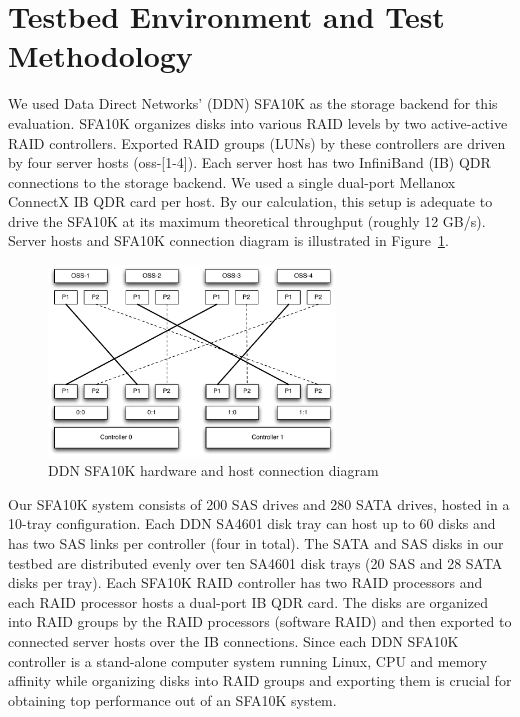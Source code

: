 \section{Testbed Environment and Test Methodology}
\label{sec:testbed}

We used Data Direct Networks' (DDN) SFA10K as the storage backend for this
evaluation. SFA10K organizes disks into various RAID levels by two
active-active RAID controllers. Exported RAID groups (LUNs) by these
controllers are driven by four server hosts (oss-[1-4]).  Each server host has
two InfiniBand (IB) QDR connections to the storage backend.  We used a single
dual-port Mellanox ConnectX IB QDR card per host.  By our calculation, this
setup is adequate to drive the SFA10K at its maximum theoretical throughput
(roughly 12 GB/s). Server hosts and SFA10K connection diagram is illustrated in
Figure~\ref{fig:ddn-sfa10k}.

\begin{figure}[htb]
\centering
\includegraphics[width=3in]{figs/sfa10k}
\caption{DDN SFA10K hardware and host connection diagram}
\label{fig:ddn-sfa10k}
\end{figure}


Our SFA10K system consists of 200 SAS drives and 280 SATA drives, hosted in a
10-tray configuration. Each DDN SA4601 disk tray can host up to 60 disks and
has two SAS links per controller (four in total). The SATA and SAS disks in our
testbed are distributed evenly over ten SA4601 disk trays (20 SAS and 28 SATA
disks per tray). Each SFA10K RAID controller has two RAID processors and each
RAID processor hosts a dual-port IB QDR card. The disks are organized into RAID
groups by the RAID processors (software RAID) and then exported to connected
server hosts over the IB connections. Since each DDN SFA10K controller is a
stand-alone computer system running Linux, CPU and memory affinity while
organizing disks into RAID groups and exporting them is crucial for obtaining
top performance out of an SFA10K system.  

